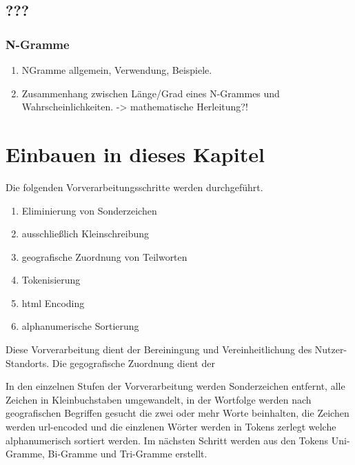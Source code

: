 		\subsubsection{}	

	\subsection{???} 
		\subsubsection{N-Gramme}
			\begin{enumerate}
				\item NGramme allgemein, Verwendung, Beispiele. 
				\item {} Zusammenhang zwischen Länge/Grad eines N-Grammes und Wahrscheinlichkeiten. -> mathematische Herleitung?!
			\end{enumerate}




\section{Einbauen in dieses Kapitel}

Die folgenden Vorverarbeitungsschritte werden durchgeführt.

	\begin{enumerate}
		\item Eliminierung von Sonderzeichen
		\item ausschließlich Kleinschreibung
		\item geografische Zuordnung von Teilworten  	
		\item Tokenisierung
		\item html Encoding
		\item alphanumerische Sortierung 
	\end{enumerate}

	Diese Vorverarbeitung dient der Bereiningung und Vereinheitlichung des Nutzer-Standorts.  
	Die gegografische Zuordnung dient der  

	In den einzelnen Stufen der Vorverarbeitung werden Sonderzeichen entfernt, alle Zeichen in Kleinbuchstaben umgewandelt, in der Wortfolge werden nach geografischen Begriffen gesucht die zwei oder mehr Worte beinhalten, die Zeichen werden url-encoded und die einzlenen Wörter werden in Tokens zerlegt welche alphanumerisch sortiert werden.
	Im nächsten Schritt werden aus den Tokens Uni-Gramme, Bi-Gramme und Tri-Gramme erstellt. 



